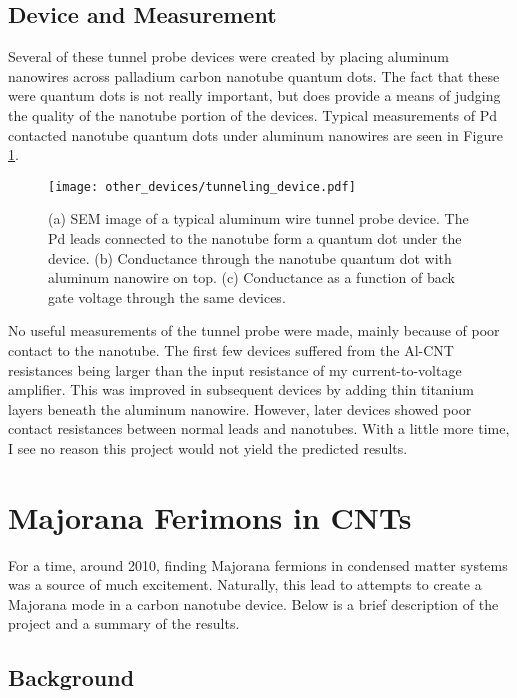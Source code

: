 \subsection{Device and Measurement}

Several of these tunnel probe devices were created by placing aluminum nanowires across palladium carbon nanotube quantum dots. The fact that these were quantum dots is not really important, but does provide a means of judging the quality of the nanotube portion of the devices. Typical measurements of Pd contacted nanotube quantum dots under aluminum nanowires are seen in Figure \ref{fig:tunneling_device}.

\begin{figure}
    \centering
    \texttt{[image: other\_devices/tunneling\_device.pdf]}
    \caption{(a) SEM image of a typical aluminum wire tunnel probe device. The Pd leads connected to the nanotube form a quantum dot under the device. (b) Conductance through the nanotube quantum dot with aluminum nanowire on top. (c) Conductance as a function of back gate voltage through the same devices.}
    \label{fig:tunneling_device}
\end{figure}

No useful measurements of the tunnel probe were made, mainly because of poor contact to the nanotube. The first few devices suffered from the Al-CNT resistances being larger than the input resistance of my current-to-voltage amplifier. This was improved in subsequent devices by adding thin titanium layers beneath the aluminum nanowire. However, later devices showed poor contact resistances between normal leads and nanotubes. With a little more time, I see no reason this project would not yield the predicted results.

\section{Majorana Ferimons in CNTs}
\label{sec:majorana}

For a time, around 2010, finding Majorana fermions in condensed matter systems was a source of much excitement. Naturally, this lead to attempts to create a Majorana mode in a carbon nanotube device. Below is a brief description of the project and a summary of the results.

\subsection{Background}

